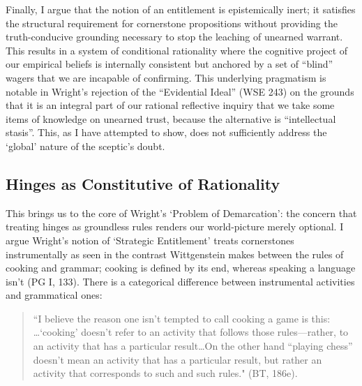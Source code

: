 Finally, I argue that the notion of an entitlement is epistemically
inert; it satisfies the structural requirement for cornerstone
propositions without providing the truth-conducive grounding necessary
to stop the leaching of unearned warrant. This results in a system of
conditional rationality where the cognitive project of our empirical
beliefs is internally consistent but anchored by a set of ``blind''
wagers that we are incapable of confirming. This underlying pragmatism
is notable in Wright's rejection of the ``Evidential Ideal'' (WSE 243)
on the grounds that it is an integral part of our rational reflective
inquiry that we take some items of knowledge on unearned trust, because
the alternative is ``intellectual stasis''. This, as I have attempted to
show, does not sufficiently address the `global' nature of the sceptic's
doubt.

\subsection{Hinges as Constitutive of Rationality}

This brings us to the core of Wright's `Problem of Demarcation': the
concern that treating hinges as groundless rules renders our
world-picture merely optional. I argue Wright's notion of `Strategic
Entitlement' treats cornerstones instrumentally as seen in the contrast
Wittgenstein makes between the rules of cooking and grammar; cooking is
defined by its end, whereas speaking a language isn't (PG I, 133). There
is a categorical difference between instrumental activities and
grammatical ones:

\begin{quote}
``I believe the reason one isn't tempted to call cooking a game is this:
\dots`cooking' doesn't refer to an activity that follows those rules---rather, to an activity that has a particular result\dots On the other hand
``playing chess'' doesn't mean an activity that has a particular result,
but rather an activity that corresponds to such and such rules." (BT,
186e).
\end{quote}

